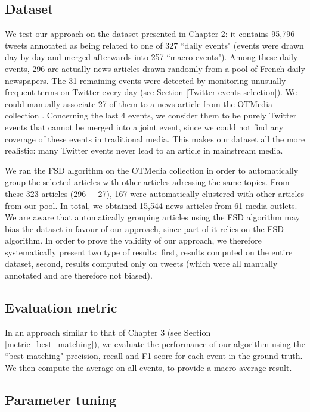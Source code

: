 \subsection{Dataset}
We test our approach on the dataset presented in Chapter 2: it contains 95,796 tweets annotated as being related to one of 327 ``daily events" (events were drawn day by day and merged afterwards into 257 ``macro events"). Among these daily events, 296 are actually news articles drawn randomly from a pool of French daily newspapers. The 31 remaining events were detected by monitoring unusually frequent terms on Twitter every day (see Section \ref{Twitter events selection}). We could manually associate 27 of them to a news article from the OTMedia collection \citep{herve2019otmedia}. Concerning the last 4 events, we consider them to be purely Twitter events that cannot be merged into a joint event, since we could not find any coverage of these events in traditional media. This makes our dataset all the more realistic: many Twitter events never lead to an article in mainstream media.

We ran the FSD algorithm on the OTMedia collection in order to automatically group the selected articles with other articles adressing the same topics. From these 323 articles (296 + 27), 167 were automatically clustered with other articles from our pool. In total, we obtained 15,544 news articles from 61 media outlets. We are aware that automatically grouping articles using the FSD algorithm may bias the dataset in favour of our approach, since part of it relies on the FSD algorithm. In order to prove the validity of our approach, we therefore systematically present two type of results: first, results computed on the entire dataset, second, results computed only on tweets (which were all manually annotated and are therefore not biased).

\subsection{Evaluation metric}
In an approach similar to that of Chapter 3 (see Section \ref{metric_best_matching}), we evaluate the performance of our algorithm using the ``best matching" precision, recall and F1 score \citep{yang1998study} for each event in the ground truth. We then compute the average on all events, to provide a macro-average result.

\subsection{Parameter tuning}

